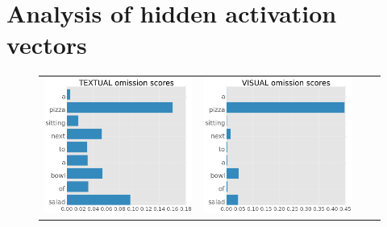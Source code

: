 \section{Analysis of hidden activation vectors}
\label{sec:macro}

\begin{figure}[t]
\hspace*{-0.5in}
\setlength{\tabcolsep}{0.01pt}
    \begin{tabular}{cccc}
    \includegraphics[scale=0.14]{new_omission_examples/textual1} &
    \includegraphics[scale=0.14]{new_omission_examples/visual1} &

\end{tabular}
\end{figure}
